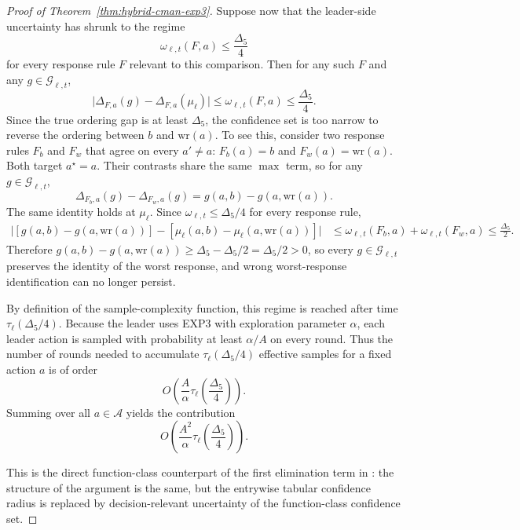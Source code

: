 \documentclass{article}
\begin{document}
\begin{proof}[Proof of Theorem~\ref{thm:hybrid-cman-exp3}]
Suppose now that the leader-side uncertainty has shrunk to the regime
\[
\omega_{\ell,t}(F,a)\le \frac{\Delta_5}{4}
\]
for every response rule $F$ relevant to this comparison. Then for any
such $F$ and any $g\in\mathcal G_{\ell,t}$,
\[
\bigl|
\Delta_{F,a}(g)-\Delta_{F,a}(\mu_\ell)
\bigr|
\le
\omega_{\ell,t}(F,a)
\le
\frac{\Delta_5}{4}.
\]
Since the true ordering gap is at least $\Delta_5$, the confidence set
is too narrow to reverse the ordering between $b$ and
$\mathrm{wr}(a)$. To see this, consider two response rules $F_b$ and $F_w$ that agree
on every $a'\neq a$: $F_b(a)=b$ and $F_w(a)=\mathrm{wr}(a)$. Both target $a^\star=a$. Their contrasts
share the same $\max$ term, so for any $g\in\mathcal G_{\ell,t}$,
\[
\Delta_{F_b,a}(g)-\Delta_{F_w,a}(g)
=g(a,b)-g(a,\mathrm{wr}(a)).
\]
The same identity holds at $\mu_\ell$. Since
$\omega_{\ell,t}\le\Delta_5/4$ for every response rule,
\begin{align*}
\bigl|[g(a,b)-g(a,\mathrm{wr}(a))]
-[\mu_\ell(a,b)-\mu_\ell(a,\mathrm{wr}(a))]\bigr|
&\le
\omega_{\ell,t}(F_b,a)+\omega_{\ell,t}(F_w,a)
\le \frac{\Delta_5}{2}.
\end{align*}
Therefore $g(a,b)-g(a,\mathrm{wr}(a))\ge \Delta_5-\Delta_5/2
=\Delta_5/2>0$, so every $g\in\mathcal G_{\ell,t}$ preserves
the identity of the worst response, and wrong worst-response
identification can no longer persist.

By definition of the sample-complexity function, this regime is
reached after time $\tau_\ell(\Delta_5/4)$. Because the leader uses
EXP3 with exploration parameter $\alpha$, each leader action is
sampled with probability at least $\alpha/A$ on every round. Thus the
number of rounds needed to accumulate
$\tau_\ell(\Delta_5/4)$ effective samples for a fixed action $a$ is of
order
\[
O\!\left(\frac{A}{\alpha}\tau_\ell\!\left(\frac{\Delta_5}{4}\right)\right).
\]
Summing over all $a\in\mathcal A$ yields the contribution
\[
O\!\left(
\frac{A^2}{\alpha}\tau_\ell\!\left(\frac{\Delta_5}{4}\right)
\right).
\]

This is the direct function-class counterpart of the first elimination
term in \cite{yu2024decentralized}: the structure of the argument is
the same, but the entrywise tabular confidence radius is replaced by
decision-relevant uncertainty of the function-class confidence set.


\end{proof}
\end{document}
